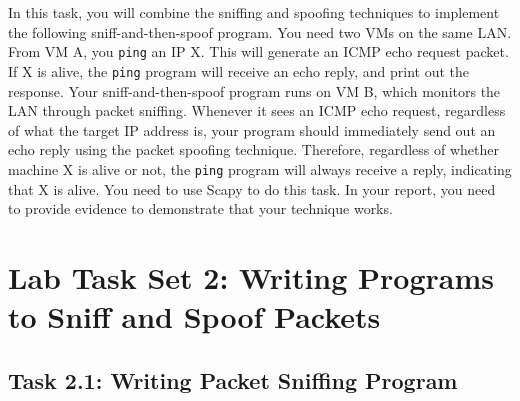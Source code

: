 In this task, you will combine the sniffing and spoofing techniques
to implement the following sniff-and-then-spoof program.
You need two VMs on the same LAN. From VM A, you
{\tt ping} an IP X. This will generate an ICMP echo
request packet. If X is alive, the {\tt ping} program will receive
an echo reply, and print out the response. Your sniff-and-then-spoof
program runs on VM B, which monitors the LAN through packet sniffing. Whenever it
sees an ICMP echo request, regardless of what the target IP address is,
your program should immediately send out an echo reply using the
packet spoofing technique. Therefore, regardless of whether machine X
is alive or not, the {\tt ping} program will always receive
a reply, indicating that X is alive. You need to use Scapy
to do this task. In your report, you need to provide evidence to demonstrate 
that your technique works. 





 
%  
  




\section{Lab Task Set 2: Writing Programs to Sniff and Spoof Packets}



\subsection{Task 2.1: Writing Packet Sniffing Program}

